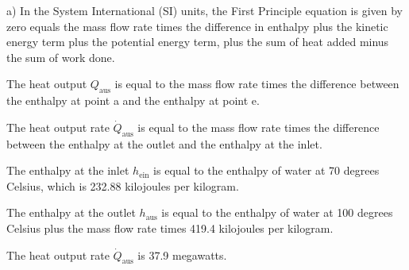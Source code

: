 a) In the System International (SI) units, the First Principle equation is given by zero equals the mass flow rate times the difference in enthalpy plus the kinetic energy term plus the potential energy term, plus the sum of heat added minus the sum of work done.

The heat output \( Q_{\text{aus}} \) is equal to the mass flow rate times the difference between the enthalpy at point a and the enthalpy at point e.

The heat output rate \( \dot{Q}_{\text{aus}} \) is equal to the mass flow rate times the difference between the enthalpy at the outlet and the enthalpy at the inlet.

The enthalpy at the inlet \( h_{\text{ein}} \) is equal to the enthalpy of water at 70 degrees Celsius, which is 232.88 kilojoules per kilogram.

The enthalpy at the outlet \( h_{\text{aus}} \) is equal to the enthalpy of water at 100 degrees Celsius plus the mass flow rate times 419.4 kilojoules per kilogram.

The heat output rate \( \dot{Q}_{\text{aus}} \) is 37.9 megawatts.